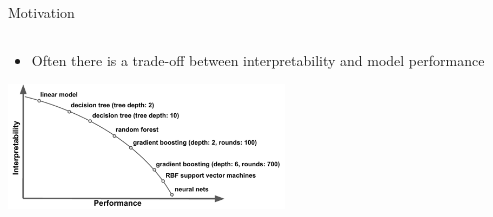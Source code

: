 \documentclass[10pt,compress,t,notes=noshow, xcolor=table]{beamer}
\begin{document}
\begin{frame}{Motivation}
\begin{columns}[T, totalwidth = \textwidth]
\begin{column}{0.42\textwidth}
    \end{column}
\end{columns}

\begin{itemize}
 \item Often there is a trade-off between interpretability and model performance 
\end{itemize}
\centering
\includegraphics[width=0.55\textwidth]{figure/performance_vs_interpretability.pdf}
\end{frame}
\end{document}

